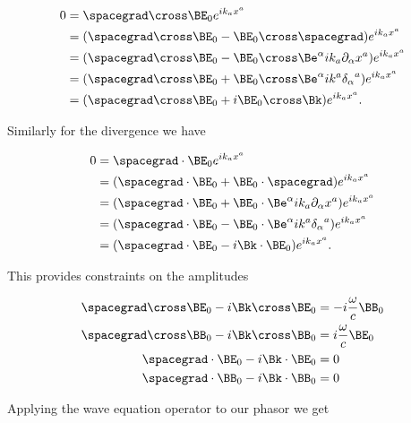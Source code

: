 \begin{align*}
0 
&= \spacegrad \cross \BE_0 e^{i k_a x^a} \\
&= (\spacegrad \cross \BE_0 - \BE_0 \cross \spacegrad) e^{i k_a x^a} \\
&= (\spacegrad \cross \BE_0 - \BE_0 \cross \Be^\alpha i k_a \partial_\alpha x^a) e^{i k_a x^a} \\
&= (\spacegrad \cross \BE_0 + \BE_0 \cross \Be^\alpha i k^a {\delta_\alpha}^a ) e^{i k_a x^a} \\
&= (\spacegrad \cross \BE_0 + i \BE_0 \cross \Bk ) e^{i k_a x^a}.
\end{align*}

Similarly for the divergence we have

\begin{align*}
0 
&= \spacegrad \cdot \BE_0 e^{i k_a x^a} \\
&= (\spacegrad \cdot \BE_0 + \BE_0 \cdot \spacegrad) e^{i k_a x^a} \\
&= (\spacegrad \cdot \BE_0 + \BE_0 \cdot \Be^\alpha i k_a \partial_\alpha x^a) e^{i k_a x^a} \\
&= (\spacegrad \cdot \BE_0 - \BE_0 \cdot \Be^\alpha i k^a {\delta_\alpha}^a ) e^{i k_a x^a} \\
&= (\spacegrad \cdot \BE_0 - i \Bk \cdot \BE_0 ) e^{i k_a x^a}.
\end{align*}

This provides constraints on the amplitudes

\begin{align}\label{eqn:relativisticElectrodynamicsT4:130}
\spacegrad \cross \BE_0 - i \Bk \cross \BE_0 &= -i \frac{\omega}{c} \BB_0 \\
\spacegrad \cross \BB_0 - i \Bk \cross \BB_0 &= i \frac{\omega}{c} \BE_0 \\
\spacegrad \cdot \BE_0 - i \Bk \cdot \BE_0 &= 0 \\
\spacegrad \cdot \BB_0 - i \Bk \cdot \BB_0 &= 0
\end{align}

%
%
%
%
Applying the wave equation operator to our phasor we get


